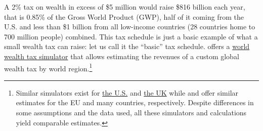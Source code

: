 A 2\% tax on wealth in excess of \$5 million would raise \$816 billion each year, that is 0.85\% of the Gross World Product (GWP), half of it coming from the U.S. and less than \$1 billion from all low-income countries (28 countries home to 700 million people) combined. This tax schedule is just a basic example of what a small wealth tax can raise: let us call it the ``basic'' tax schedule. \citet{chancel_world_2022} offers a \href{https://wid.world/world-wealth-tax-simulator/}{world wealth tax simulator} that allows estimating the revenues of a custom global wealth tax by world region.\footnote{Similar simulators exist for \href{https://taxjusticenow.org/}{the U.S.} \citep{saez_triumph_2019} and \href{http://taxsimulator.ukwealth.tax/#/appendix}{the UK} while \citet{kapeller_european_2021} and \citet{oxfam_taxing_2022} offer similar estimates for the EU and many countries, respectively. Despite differences in some assumptions and the data used, all these simulators and calculations yield comparable estimates.} 